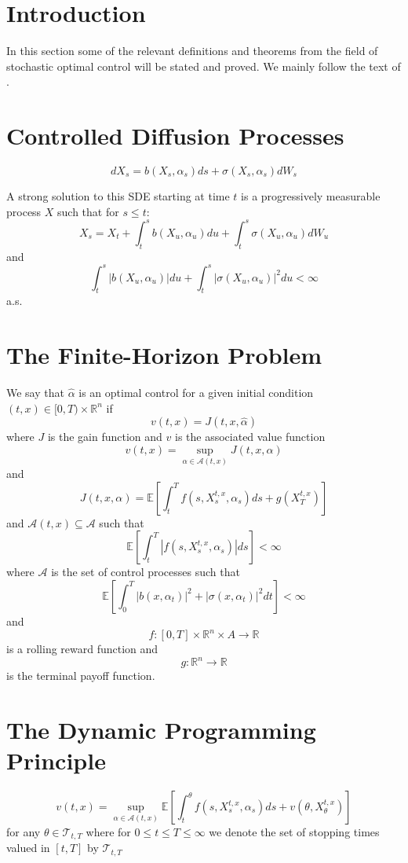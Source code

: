 \section{Introduction}
In this section some of the relevant definitions and theorems from the field of stochastic optimal control 
will be stated and proved. We mainly follow the text of \cite{pham}.
\section{Controlled Diffusion Processes}
\begin{definition}
    \begin{equation}
        dX_s=b(X_s,\alpha_s)ds+\sigma(X_s,\alpha_s)dW_s
    \end{equation}
\end{definition}

\begin{definition}
    A strong solution to this SDE starting at time $t$ is a progressively measurable process $X$ such that for $s\leq t$:
    $$X_s=X_t+\int_{t}^{s}b(X_u,\alpha_u)du+\int_t^s\sigma(X_u,\alpha_u)dW_u$$
    and
    $$\int_t^s|b(X_u,\alpha_u)|du+\int_t^s|\sigma(X_u,\alpha_u)|^2du<\infty$$
    a.s.
\end{definition}
\section{The Finite-Horizon Problem}
\begin{definition}
    
\end{definition}
We say that $\hat{\alpha}$ is an optimal control for a given initial condition $ (t,x) \in [0,T) \times \mathbb{R}^n $ if
$$v(t,x)=J(t,x,\hat{\alpha})$$
where $J$ is the gain function and $v$ is the associated value function
$$v(t,x)=\sup\limits_{\alpha\in\mathcal{A}(t,x)}J(t,x,\alpha)$$
and
$$J(t,x,\alpha)=\mathbb{E}\left[\int_t^Tf(s,X_s^{t,x},\alpha_s)ds+g(X_T^{t,x})\right]$$
and $\mathcal{A}(t,x)\subseteq\mathcal{A}$ such that
$$\mathbb{E}\left[\int_t^T|f(s,X_s^{t,x},\alpha_s)|ds\right]<\infty$$
where $\mathcal{A}$ is the set of control processes such that
$$\mathbb{E}\left[\int_0^T|b(x,\alpha_t)|^2+|\sigma(x,\alpha_t)|^2dt\right]<\infty$$
and
$$f:[0,T]\times\mathbb{R}^n\times A\rightarrow\mathbb{R}$$
is a rolling reward function and 
$$g:\mathbb{R}^n\rightarrow\mathbb{R}$$
is the terminal payoff function.
\section{The Dynamic Programming Principle}
$$v(t,x)=\sup\limits_{\alpha\in\mathcal{A}(t,x)}\mathbb{E}\left[\int_t^\theta f(s,X_s^{t,x},\alpha_s)ds+v(\theta,X_\theta^{t,x})\right]$$
for any $\theta\in\mathcal{T}_{t,T}$ where for $0\leq t\leq T\leq\infty$ we denote the set of stopping times valued in $[t,T]$ by $\mathcal{T}_{t,T}$
